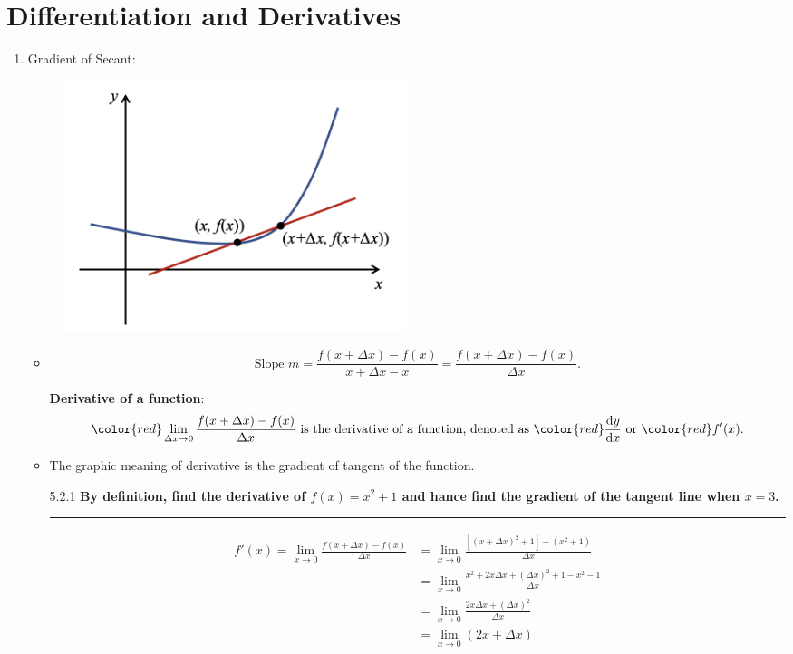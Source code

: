 \documentclass[12pt, a4paper]{article}
\begin{document}
\section{Differentiation and Derivatives}
\begin{enumerate}
    \item Gradient of Secant: 
    \begin{figure}[H]
        \centering 
        \includegraphics[width=0.5\textwidth]{Fig.5.3.jpg} 
    \end{figure}
    \begin{itemize}
        \item $$\text{Slope }m=\frac{f(x+\Delta x)-f(x)}{x+\Delta x-x}=\frac{f(x+\Delta x)-f(x)}{\Delta x}.$$
        \begin{myclaim}{ }{}
            \textbf{\color{red}Derivative of a function}: 
            $${\color{red}\lim_{\Delta x\rightarrow 0}\frac{f(x+\Delta x)-f(x)}{\Delta x}}\text{ is the derivative of a function, denoted as } {\color{red}\frac{\mathrm{d}y}{\mathrm{d}x}}\text{ or }{\color{red}f'(x)}.$$
        \end{myclaim}
    \item The graphic meaning of derivative is the gradient of tangent of the function. 
    \begin{example}{5.2.1}{}
        \textbf{By definition, find the derivative of $f(x)=x^2+1$ and hance find the gradient of the tangent line when $x=3$.}\\
        \noindent\rule[0.1pt]{\textwidth}{1pt}
        $$\begin{aligned}
            f'(x)=\lim_{x\to 0}\frac{f(x+\Delta x)-f(x)}{\Delta x}&=\lim_{x\to 0}\frac{\left[(x+\Delta x)^2+1\right]-(x^2+1)}{\Delta x}\\
            &=\lim_{x\to 0}\frac{x^2+2x\Delta x+(\Delta x)^2+1-x^2-1}{\Delta x}\\
            &=\lim_{x\to 0}\frac{2x\Delta x+(\Delta x)^2}{\Delta x}\\
            &=\lim_{x\to 0}\left(2x+\Delta x\right)\\

\end{aligned}$$
\end{example}
\end{itemize}
\end{enumerate}
\end{document}

